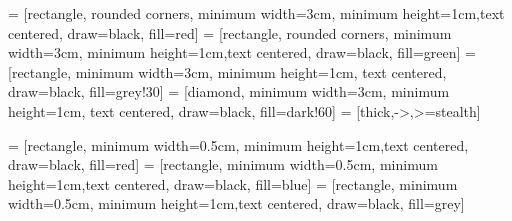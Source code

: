 

 = [rectangle, rounded corners, minimum width=3cm, minimum height=1cm,text centered, draw=black, fill=red]
 = [rectangle, rounded corners, minimum width=3cm, minimum height=1cm,text centered, draw=black, fill=green]
 = [rectangle, minimum width=3cm, minimum height=1cm, text centered, draw=black, fill=grey!30]
 = [diamond, minimum width=3cm, minimum height=1cm, text centered, draw=black, fill=dark!60]
 = [thick,->,>=stealth]

 = [rectangle, minimum width=0.5cm, minimum height=1cm,text centered, draw=black, fill=red]
 = [rectangle, minimum width=0.5cm, minimum height=1cm,text centered, draw=black, fill=blue]
 = [rectangle, minimum width=0.5cm, minimum height=1cm,text centered, draw=black, fill=grey]